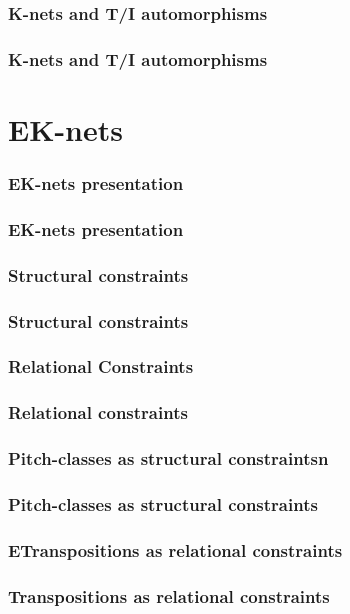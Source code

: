 \documentclass{beamer}
\begin{document}
\subsubsection{K-nets and T/I automorphisms}
\begin{frame}[fragile]
	\frametitle{K-nets and T/I automorphisms}
\end{frame}


\section{EK-nets}

\subsubsection{EK-nets presentation}
\begin{frame}
	\frametitle{EK-nets presentation}
\end{frame}

\subsubsection{Structural constraints}
\begin{frame}
	\frametitle{Structural constraints}
\end{frame}

\subsubsection{Relational Constraints}
\begin{frame}
	\frametitle{Relational constraints}
\end{frame}

\subsubsection{Pitch-classes as structural constraintsn}
\begin{frame}
	\frametitle{Pitch-classes as structural constraints}
\end{frame}

\subsubsection{ETranspositions as relational constraints}
\begin{frame}
	\frametitle{Transpositions as relational constraints}
\end{frame}
\end{document}
